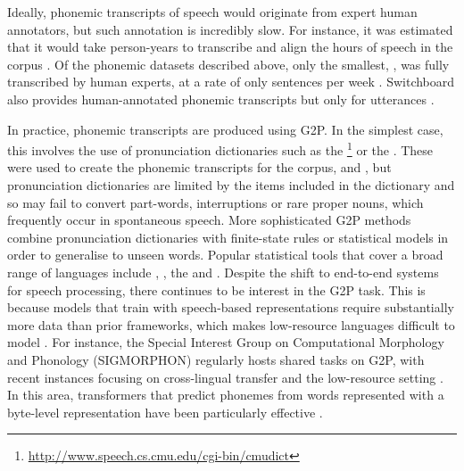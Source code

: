 Ideally, phonemic transcripts of speech would originate from expert human annotators, but such annotation is incredibly slow. For instance, it was estimated that it would take  person-years to transcribe and align the  hours of speech in the  corpus \citep{coleman2011mining}. Of the phonemic datasets described above, only the smallest, , was fully transcribed by human experts, at a rate of only  sentences per week \citep{zue1996transcription, lamel1989speech}. Switchboard also provides human-annotated phonemic transcripts but only for  utterances \citep{greenberg1996insights}.

In practice, phonemic transcripts are produced using G2P. In the simplest case, this involves the use of pronunciation dictionaries such as the \footnote{\url{http://www.speech.cs.cmu.edu/cgi-bin/cmudict}} or the  \citep{jones2011cambridge}. These were used to create the phonemic transcripts for the  corpus,  and , but pronunciation dictionaries are limited by the items included in the dictionary and so may fail to convert part-words, interruptions or rare proper nouns, which frequently occur in spontaneous speech. More sophisticated G2P methods combine pronunciation dictionaries with finite-state rules \citep{kaplan1994regular} or statistical models \citep{bisani-2008-g2p} in order to generalise to unseen words. Popular statistical tools that cover a broad range of languages include  \citep{NOVAK_MINEMATSU_HIROSE_2016}, \epitran \citep{Mortensen-et-al:2018}, the  \citep{johnson2020g2p} and \phonemizer \citep{Bernard2021}. Despite the shift to end-to-end systems for speech processing, there continues to be interest in the G2P task. This is because models that train with speech-based representations require substantially more data than prior frameworks, which makes low-resource languages difficult to model \citep{li2022recent}. For instance, the Special Interest Group on Computational Morphology and Phonology (SIGMORPHON) regularly hosts shared tasks on G2P, with recent instances focusing on cross-lingual transfer and the low-resource setting \citep{mccarthy-etal-2023-sigmorphon}. In this area, transformers that predict phonemes from words represented with a byte-level representation have been particularly effective \citep{Zhu2022}. 

